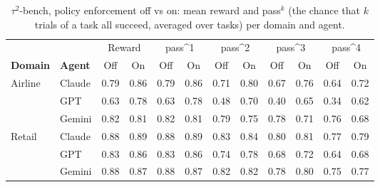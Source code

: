 \begin{table}[t]
\caption{$\tau^2$-bench, policy enforcement off vs on: mean reward and pass$^k$ (the chance that $k$ trials of a task all succeed, averaged over tasks) per domain and agent.}
\label{tab:tau2-paired}
\small
\centering
\begin{tabular}{@{}llcccccccccc@{}}
\toprule
 & & \multicolumn{2}{c}{Reward} & \multicolumn{2}{c}{pass\textasciicircum{}1} & \multicolumn{2}{c}{pass\textasciicircum{}2} & \multicolumn{2}{c}{pass\textasciicircum{}3} & \multicolumn{2}{c}{pass\textasciicircum{}4} \\
\cmidrule(lr){3-4} \cmidrule(lr){5-6} \cmidrule(lr){7-8} \cmidrule(lr){9-10} \cmidrule(lr){11-12}
\textbf{Domain} & \textbf{Agent} & Off & On & Off & On & Off & On & Off & On & Off & On \\
\midrule
Airline & Claude & 0.79 & 0.86 & 0.79 & 0.86 & 0.71 & 0.80 & 0.67 & 0.76 & 0.64 & 0.72 \\
 & GPT & 0.63 & 0.78 & 0.63 & 0.78 & 0.48 & 0.70 & 0.40 & 0.65 & 0.34 & 0.62 \\
 & Gemini & 0.82 & 0.81 & 0.82 & 0.81 & 0.79 & 0.75 & 0.78 & 0.71 & 0.76 & 0.68 \\
\midrule
Retail & Claude & 0.88 & 0.89 & 0.88 & 0.89 & 0.83 & 0.84 & 0.80 & 0.81 & 0.77 & 0.79 \\
 & GPT & 0.83 & 0.86 & 0.83 & 0.86 & 0.74 & 0.78 & 0.68 & 0.72 & 0.64 & 0.68 \\
 & Gemini & 0.88 & 0.87 & 0.88 & 0.87 & 0.82 & 0.82 & 0.78 & 0.80 & 0.75 & 0.77 \\
\bottomrule
\end{tabular}
\end{table}


